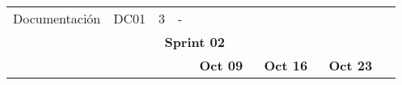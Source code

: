 \begin{longtable}[c]{llclllllllllllllllll}
        \multicolumn{1}{|l|}{Documentación}                                                   & \multicolumn{1}{l|}{DC01}                                                      & \multicolumn{1}{c|}{3}                                                           & \multicolumn{1}{l|}{-}                                                               & \cellcolor[HTML]{C9C9C9}        & \cellcolor[HTML]{C9C9C9}        & \cellcolor[HTML]{C9C9C9}        & \cellcolor[HTML]{C9C9C9}        & \cellcolor[HTML]{C9C9C9}        & \cellcolor[HTML]{C9C9C9}        & \cellcolor[HTML]{C9C9C9}        & \cellcolor[HTML]{C9C9C9}        & \cellcolor[HTML]{C9C9C9}        & \cellcolor[HTML]{C9C9C9}        & \cellcolor[HTML]{C9C9C9}        & \cellcolor[HTML]{C9C9C9}        & \cellcolor[HTML]{C9C9C9}        & \cellcolor[HTML]{C9C9C9}        & \multicolumn{1}{l|}{\cellcolor[HTML]{C9C9C9}} &  \\ \cline{1-19}
        \multicolumn{19}{|c|}{\cellcolor[HTML]{305496}\textbf{Sprint 02}}                                                                                                                                                                                                                                                                                                                                                                                                                                                                                                                                                                                                                                                                                                                                                                                                                            &  \\ \cline{1-19}
        \multicolumn{1}{|c|}{\cellcolor[HTML]{FFFFFF}}                                        & \multicolumn{1}{c|}{\cellcolor[HTML]{FFFFFF}}                                  & \multicolumn{1}{c|}{\cellcolor[HTML]{FFFFFF}}                                    & \multicolumn{1}{c|}{\cellcolor[HTML]{FFFFFF}}                                        & \multicolumn{5}{c|}{\textbf{Oct 09}}                                                                                                                                    & \multicolumn{5}{c|}{\textbf{Oct 16}}                                                                                                                                    & \multicolumn{5}{c|}{\textbf{Oct 23}}                                                                                                                                                  &  \\ \cline{5-19}

\end{longtable}
